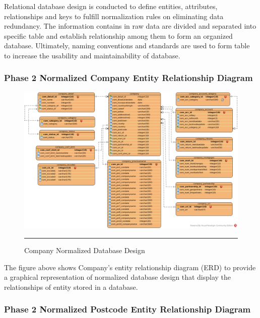 Relational database design is conducted to define entities, attributes, relationships and keys to fulfill normalization rules on eliminating data redundancy. The information contains in raw data are divided and separated into specific table and establish relationship among them to form an organized database. Ultimately, naming conventions and standards are used to form table to increase the usability and maintainability of database. 

\subsubsection{Phase 2 Normalized Company Entity Relationship Diagram} 

\begin{figure}[H]
	\centering
	\includegraphics[width=1.0\textwidth]{FYP2/Chapter3/FYP2-Company-Normalized-ERD.png}
	\rule{35em}{0.5pt}
	\caption[Company Normalized Database Design]{Company Normalized Database Design}
\end{figure} 

The figure above shows Company's entity relationship diagram (ERD) to provide a graphical representation of normalized database design that display the relationships of entity stored in a database.

\subsubsection{Phase 2 Normalized Postcode Entity Relationship Diagram}

